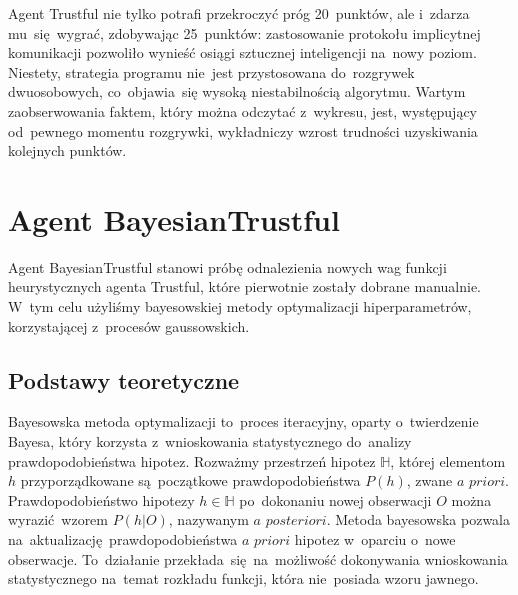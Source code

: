 \documentclass[declaration,shortabstract,inz]{iithesis}
\begin{document}
Agent Trustful nie tylko potrafi przekroczyć próg 20~punktów, ale i~zdarza mu~się~wygrać, zdobywając 25~punktów: zastosowanie protokołu implicytnej komunikacji pozwoliło wynieść osiągi sztucznej inteligencji na~nowy poziom. Niestety, strategia programu nie~jest przystosowana do~rozgrywek dwuosobowych, co~objawia~się wysoką niestabilnością algorytmu. Wartym zaobserwowania faktem, który można odczytać z~wykresu, jest, występujący od~pewnego momentu rozgrywki, wykładniczy wzrost trudności uzyskiwania kolejnych punktów.

\section{Agent BayesianTrustful}

Agent BayesianTrustful stanowi próbę odnalezienia nowych wag funkcji heurystycznych agenta Trustful, które pierwotnie zostały dobrane manualnie. W~tym celu użyliśmy bayesowskiej metody optymalizacji hiperparametrów, korzystającej z~procesów gaussowskich.

\subsection*{Podstawy teoretyczne}

Bayesowska metoda optymalizacji to~proces iteracyjny, oparty o~twierdzenie Bayesa, który korzysta z~wnioskowania statystycznego do~analizy prawdopodobieństwa hipotez. Rozważmy przestrzeń hipotez $\mathbb{H}$, której elementom $h$ przyporządkowane są~początkowe prawdopodobieństwa $P(h)$, zwane $\textit{a priori}$. Prawdopodobieństwo hipotezy $h\in\mathbb{H}$ po~dokonaniu nowej obserwacji $O$ można wyrazić wzorem $P(h|O)$, nazywanym $\textit{a posteriori}$. Metoda bayesowska pozwala na~aktualizację prawdopodobieństwa $\textit{a priori}$ hipotez w~oparciu o~nowe obserwacje. To~działanie przekłada~się~na~możliwość dokonywania wnioskowania statystycznego na~temat rozkładu funkcji, która nie~posiada wzoru jawnego.
\end{document}
